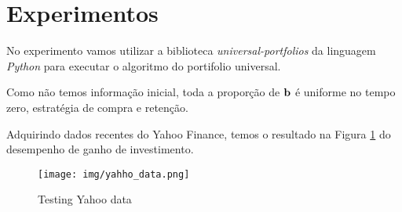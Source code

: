 \section{Experimentos}

No experimento vamos utilizar a biblioteca \emph{universal-portfolios}\cite{universal-portfolios} da linguagem \emph{Python} para executar o algoritmo do portifolio universal.

Como não temos informação inicial, toda a proporção de $\bf{b}$ é uniforme no tempo zero, estratégia de compra e retenção.

Adquirindo dados recentes do Yahoo Finance, temos o resultado na Figura \ref{fig:yahoo_data} do desempenho de ganho de investimento.

\begin{figure}
    \centering
    \texttt{[image: img/yahho\_data.png]}
    \caption{Testing Yahoo data}
    \label{fig:yahoo_data}
\end{figure}
